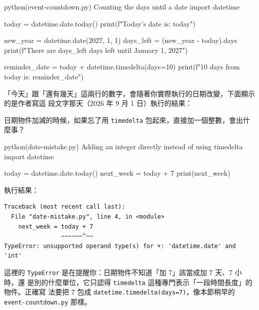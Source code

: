\begin{example}{python}{(event-countdown.py) Counting the days until a date}
import datetime

today = datetime.date.today()
print(f"Today's date is: {today}")

new_year = datetime.date(2027, 1, 1)
days_left = (new_year - today).days
print(f"There are {days_left} days left until January 1, 2027")

reminder_date = today + datetime.timedelta(days=10)
print(f"10 days from today is: {reminder_date}")
\end{example}

「今天」跟「還有幾天」這兩行的數字，會隨著你實際執行的日期改變，下面顯示的是作者寫這
段文字那天（2026 年 9 月 1 日）執行的結果：


日期物件加減的時候，如果忘了用 \texttt{timedelta} 包起來，直接加一個整數，會出什麼事？

\begin{example}{python}{(date-mistake.py) Adding an integer directly instead of using timedelta}
import datetime

today = datetime.date.today()
next_week = today + 7
print(next_week)
\end{example}

執行結果：

\begin{verbatim}
Traceback (most recent call last):
  File "date-mistake.py", line 4, in <module>
    next_week = today + 7
                ~~~~~~^~~
TypeError: unsupported operand type(s) for +: 'datetime.date' and 'int'
\end{verbatim}

這裡的 \texttt{TypeError} 是在提醒你：日期物件不知道「加 7」該當成加 7 天、7 小時，還
是別的什麼單位，它只認得 \texttt{timedelta} 這種專門表示「一段時間長度」的物件。正確寫
法要把 7 包成 \texttt{datetime.timedelta(days=7)}，像本節稍早的
\texttt{event-countdown.py} 那樣。

